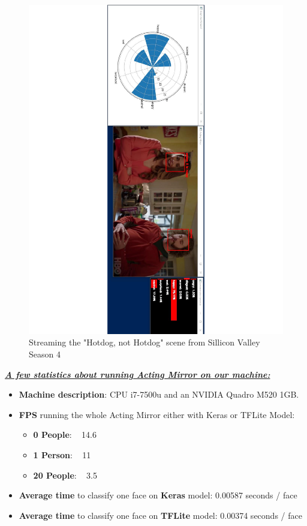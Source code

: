 \documentclass[runningheads,a4paper,11pt]{report}
\begin{document}
\begin{figure}[htbp]
\begin{center}
	\includegraphics[angle=90, scale=0.47]{Fig/hotdog_not_hotdog_emotion.pdf}
	\caption{Streaming the "Hotdog, not Hotdog" scene from Sillicon Valley Season 4}
	\label{hotdog_not_hotdog_emotion}
\end{center}
\end{figure}

\underline{\textbf{\emph{A few statistics about running Acting Mirror on our machine:}}}
\begin{itemize}
	\item \textbf{Machine description}: CPU i7-7500u and an NVIDIA Quadro M520 1GB.
	\item \textbf{FPS} running the whole Acting Mirror either with Keras or TFLite Model:
	\begin{itemize}
		\item \textbf{0 People}: ~ 14.6
		\item \textbf{1 Person}: ~ 11
		\item \textbf{20 People}: ~ 3.5 
	\end{itemize}
	\item \textbf{Average time} to classify one face on \textbf{Keras} model: 0.00587 seconds / face
	\item \textbf{Average time} to classify one face on \textbf{TFLite} model: 0.00374 seconds / face
\end{itemize}
\end{document}
